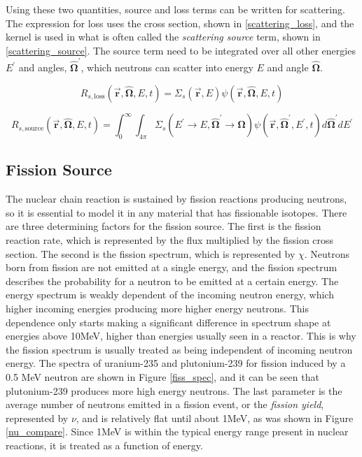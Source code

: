 Using these two quantities, source and loss terms can be written for scattering.  The expression for loss uses the cross section, shown in \eqref{scattering_loss}, and the kernel is used in what is often called the \emph{scattering source} term, shown in \eqref{scattering_source}.  The source term need to be integrated over all other energies $E^\prime$ and angles, $\boldsymbol{\hat{\Omega}}^\prime$, which neutrons can scatter into energy $E$ and angle $\boldsymbol{\hat{\Omega}}$.

\begin{equation}
\label{scattering_loss}
R_{s, \mathrm{loss}}( \boldsymbol{\vec{r}},\boldsymbol{\hat{\Omega}},E,t ) = \Sigma_s (\boldsymbol{\vec{r}},E) \psi(\boldsymbol{\vec{r}},\boldsymbol{\hat{\Omega}},E,t)
 \end{equation}
 
 \begin{equation}
\label{scattering_source}
R_{s, \mathrm{source}}(\boldsymbol{\vec{r}},\boldsymbol{\hat{\Omega}},E,t) = \int_0^\infty  \int_{4\pi} \Sigma_s(E^\prime \rightarrow E,\boldsymbol{\hat{\Omega}}^\prime \rightarrow \boldsymbol{\hat{\Omega}}) \psi(\boldsymbol{\vec{r}},\boldsymbol{\hat{\Omega}}^\prime,E^\prime,t) d\boldsymbol{\hat{\Omega}}^\prime dE^\prime
 \end{equation}
 
 \subsection{Fission Source}

The nuclear chain reaction is sustained by fission reactions producing neutrons, so it is essential to model it in any material that has fissionable isotopes.  There are three determining factors for the fission source.  The first is the fission reaction rate, which is represented by the flux multiplied by the fission cross section.  The second is the fission spectrum, which is represented by $\chi$.  Neutrons born from fission are not emitted at a single energy, and the fission spectrum describes the probability for a neutron to be emitted at a certain energy.  The energy spectrum is weakly dependent of the incoming neutron energy, which higher incoming energies producing more higher energy neutrons.  This dependence only starts making a significant difference in spectrum shape at energies above 10MeV, higher than energies usually seen in a reactor.  This is why the fission spectrum is usually treated as being independent of incoming neutron energy.  The spectra of uranium-235 and plutonium-239 for fission induced by a 0.5 MeV neutron are shown in Figure \ref{fiss_spec}, and it can be seen that plutonium-239 produces more high energy neutrons.  The last parameter is the average number of neutrons emitted in a fission event, or the \emph{fission yield}, represented by $\nu$, and is relatively flat until about 1MeV, as was shown in Figure \ref{nu_compare}.  Since 1MeV is within the typical energy range present in nuclear reactions, it is treated as a function of energy.

